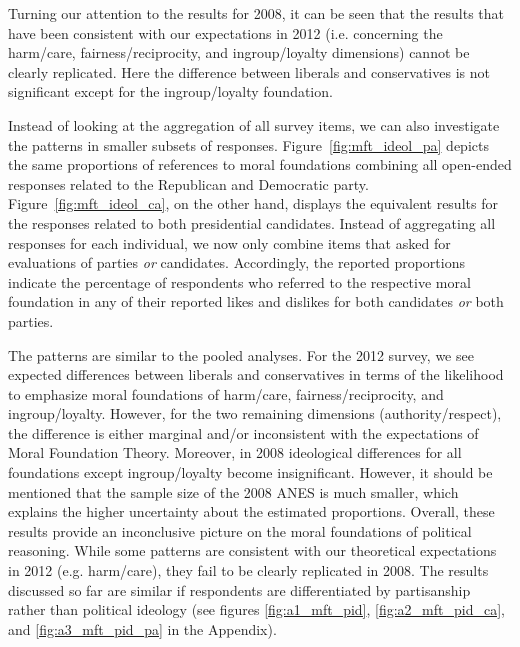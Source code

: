 \documentclass[12pt]{paper}
\begin{document}
Turning our attention to the results for 2008, it can be seen that the results that have been consistent with our expectations in 2012 (i.e. concerning the harm/care, fairness/reciprocity, and ingroup/loyalty dimensions) cannot be clearly replicated. Here the difference between liberals and conservatives is not significant except for the ingroup/loyalty foundation.

Instead of looking at the aggregation of all survey items, we can also investigate the patterns in smaller subsets of responses. Figure~\ref{fig:mft_ideol_pa} depicts the same proportions of references to moral foundations combining all open-ended responses related to the Republican and Democratic party. Figure~\ref{fig:mft_ideol_ca}, on the other hand, displays the equivalent results for the responses related to both presidential candidates. Instead of aggregating all responses for each individual, we now only combine items that asked for evaluations of parties \textit{or} candidates. Accordingly, the reported proportions indicate the percentage of respondents who referred to the respective moral foundation in any of their reported likes and dislikes for both candidates \textit{or} both parties.

The patterns are similar to the pooled analyses. For the 2012 survey, we see expected differences between liberals and conservatives in terms of the likelihood to emphasize moral foundations of harm/care, fairness/reciprocity, and ingroup/loyalty. However, for the two remaining dimensions (authority/respect), the difference is either marginal and/or inconsistent with the expectations of Moral Foundation Theory. Moreover, in 2008 ideological differences for all foundations except ingroup/loyalty become insignificant. However, it should be mentioned that the sample size of the 2008 ANES is much smaller, which explains the higher uncertainty about the estimated proportions. Overall, these results provide an inconclusive picture on the moral foundations of political reasoning. While some patterns are consistent with our theoretical expectations in 2012 (e.g. harm/care), they fail to be clearly replicated in 2008. The results discussed so far are similar if respondents are differentiated by partisanship rather than political ideology (see figures \ref{fig:a1_mft_pid}, \ref{fig:a2_mft_pid_ca}, and \ref{fig:a3_mft_pid_pa} in the Appendix).
\end{document}
